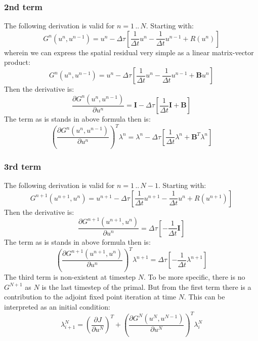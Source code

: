 \subsubsection*{2nd term}
The following derivation is valid for $n = 1\,..\,N$. Starting with:
\begin{equation}
G^n\left( u^n,u^{n-1} \right) = u^n - \Delta\tau\left[ \frac{1}{\Delta t} u^{n} - \frac{1}{\Delta t} u^{n-1} + R \left( u^n \right) \right]
\end{equation}
wherein we can express the spatial residual very simple as a linear matrix-vector product:
\begin{equation}
G^n\left( u^n,u^{n-1} \right) = u^n - \Delta\tau\left[ \frac{1}{\Delta t} u^{n} - \frac{1}{\Delta t} u^{n-1} + \mathbf{B}u^n  \right]
\end{equation}
Then the derivative is:
\begin{equation}
\frac{\partial G^n\left( u^n,u^{n-1} \right)}{\partial u^n} = \mathbf{I} - \Delta\tau\left[ \frac{1}{\Delta t} \mathbf{I} + \mathbf{B} \right]
\end{equation}
The term as is stands in above formula then is:
\begin{equation}
\left( \frac{\partial G^n\left( u^n,u^{n-1} \right)}{\partial u^n} \right)^T \lambda^n = \lambda^n - \Delta\tau\left[ \frac{1}{\Delta t} \lambda^n + \mathbf{B}^T \lambda^n \right]
\end{equation}
\subsubsection*{3rd term}
The following derivation is valid for $n = 1\,..\,N-1$. Starting with:
\begin{equation}
G^{n+1}\left( u^{n+1},u^{n} \right) = u^{n+1} - \Delta\tau\left[ \frac{1}{\Delta t} u^{n+1} - \frac{1}{\Delta t} u^{n} + R \left( u^{n+1} \right) \right]
\end{equation}
Then the derivative is:
\begin{equation}
\frac{\partial G^{n+1}\left( u^{n+1},u^{n} \right)}{\partial u^n} =  \Delta\tau\left[ -\frac{1}{\Delta t} \mathbf{I} \right]
\end{equation}
The term as is stands in above formula then is:
\begin{equation}
\left( \frac{\partial G^{n+1}\left( u^{n+1},u^{n} \right)}{\partial u^n} \right)^T \lambda^{n+1} =   \Delta\tau\left[ -\frac{1}{\Delta t} \lambda^{n+1} \right]
\end{equation}
The third term is non-existent at timestep $N$. To be more specific, there is no $G^{N+1}$ as $N$ is the last timestep of the primal. But from the first term there is a contribution to the adjoint fixed point iteration at time $N$. This can be interpreted as an initial condition:
\begin{equation}
\lambda^{N}_{i+1} = \left( \frac{\partial J}{\partial u^N} \right)^T + \left( \frac{\partial G^N\left( u^N,u^{N-1} \right)}{\partial u^N}  \right)^T \lambda^N_i  
\end{equation}
